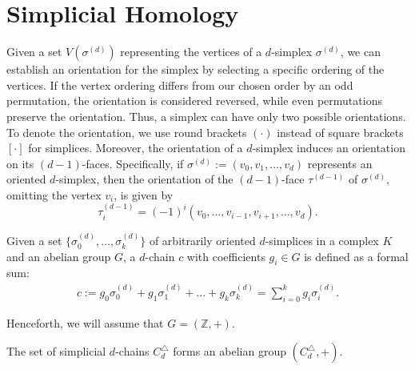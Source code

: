 \section{Simplicial Homology}
\label{SimplicialHomology}
Given a set \( V(\sigma^{(d)}) \) representing the vertices of a \( d \)-simplex
\( \sigma^{(d)} \), we can establish an orientation for the simplex by selecting a
specific ordering of the vertices. If the vertex ordering differs from our chosen
order by an odd permutation, the orientation is considered reversed, while even permutations
preserve the orientation. Thus, a simplex can have only two possible orientations. To denote the orientation, we use round brackets $(\cdot)$ instead of square brackets $[\cdot]$ for simplices.
Moreover, the orientation of a \( d \)-simplex induces an orientation on its \( (d-1) \)-faces.
Specifically, if \( \sigma^{(d)} := (v_{0}, v_{1}, \ldots, v_{d}) \) represents an oriented
\( d \)-simplex, then the orientation of the \( (d-1) \)-face \( \tau^{(d-1)} \) of
\( \sigma^{(d)} \), omitting the vertex \( v_{i} \), is given by
\begin{equation}
	\tau_{i}^{(d-1)} = (-1)^{i} (v_{0}, \ldots, v_{i-1}, v_{i+1}, \ldots, v_{d}).
\end{equation}

\begin{definition}[$d$-chain]{\cite[\S 2.3]{zomorodian2004computing}}
	\label{d-Chain}
	Given a set \(\{\sigma_{0}^{(d)}, \ldots, \sigma_{k}^{(d)}\}\) of arbitrarily oriented \(d\)-simplices in a complex \(K\) and an abelian group \(G\), a \(d\)-chain \(c\) with coefficients \(g_{i} \in G\) is defined as a formal sum:
	\begin{align}
		c := g_{0}\sigma^{(d)}_{0} + g_{1}\sigma^{(d)}_{1} + \ldots + g_{k}\sigma^{(d)}_{k} = \sum_{i=0}^{k} g_{i}\sigma^{(d)}_{i}. 
	\end{align}
\end{definition}

Henceforth, we will assume that \( G = (\mathbb{Z}, +) \).

\begin{lemma}
	The set of simplicial \( d \)-chains \( C^{\triangle}_{d} \) forms an abelian group \( (C^{\triangle}_{d}, +) \).
\end{lemma}

